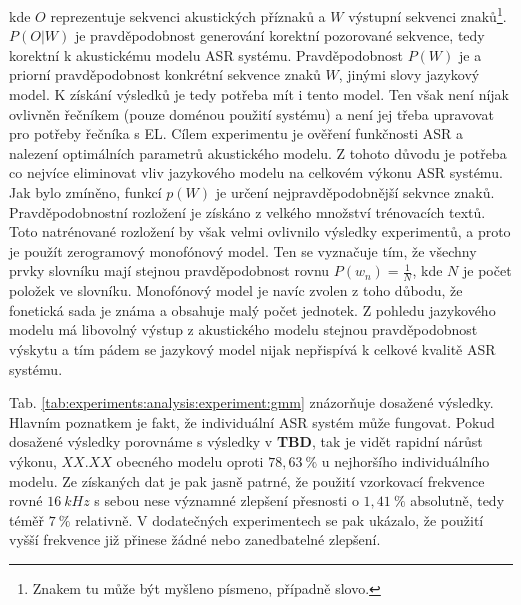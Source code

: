 \noindent kde $O$ reprezentuje sekvenci akustických příznaků a $W$ výstupní sekvenci znaků\footnote{Znakem tu může být myšleno písmeno, případně slovo.}. $P\left(O | W\right)$ je pravděpodobnost generování korektní pozorované sekvence, tedy korektní k akustickému modelu ASR systému. Pravděpodobnost $P\left(W\right)$ je a priorní pravděpodobnost konkrétní sekvence znaků $W$, jinými slovy jazykový model. K získání výsledků je tedy potřeba mít i tento model. Ten však není níjak ovlivněn řečníkem (pouze doménou použití systému) a není jej třeba upravovat pro potřeby řečníka s EL. Cílem experimentu je ověření funkčnosti ASR a nalezení optimálních parametrů akustického modelu. Z tohoto důvodu je potřeba co nejvíce eliminovat vliv jazykového modelu na celkovém výkonu ASR systému. Jak bylo zmíněno, funkcí $p\left(W\right)$ je určení nejpravděpodobnější sekvnce znaků. Pravděpodobnostní rozložení je získáno z velkého množství trénovacích textů. Toto natrénované rozložení by však velmi ovlivnilo výsledky experimentů, a proto je použít zerogramový monofónový model. Ten se vyznačuje tím, že všechny prvky slovníku mají stejnou pravděpodobnost rovnu $P(w_n) = \frac{1}{N}$, kde $N$ je počet položek ve slovníku. Monofónový model je navíc zvolen z toho důbodu, že fonetická sada je známa a obsahuje malý počet jednotek. Z pohledu jazykového modelu má libovolný výstup z akustického modelu stejnou pravděpodobnost výskytu a tím pádem se jazykový model nijak nepřispívá k celkové kvalitě ASR systému.

Tab. \ref{tab:experiments:analysis:experiment:gmm} znázorňuje dosažené výsledky. Hlavním poznatkem je fakt, že individuální ASR systém může fungovat. Pokud dosažené výsledky porovnáme s výsledky v \textbf{TBD}, tak je vidět rapidní nárůst výkonu, $XX.XX$ obecného modelu oproti $78,63\ \%$ u nejhoršího individuálního modelu. Ze získaných dat je pak jasně patrné, že použití vzorkovací frekvence rovné $16\ kHz$ s sebou nese významné zlepšení přesnosti o $1,41\ \%$ absolutně, tedy téměř $7\ \%$ relativně. V dodatečných experimentech se pak ukázalo, že použití vyšší frekvence již přinese žádné nebo zanedbatelné zlepšení.

